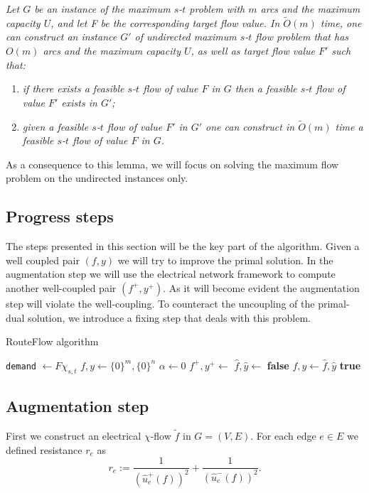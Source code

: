 \begin{lemma}
\textit{Let $G$ be an instance of the maximum $s$-$t$ problem with $m$ arcs and the maximum capacity $U$, and let F be the corresponding target flow value. In $\tilde  O(m)$ time, one can construct an instance $G'$ of undirected maximum $s$-$t$ flow problem that has $O(m)$ arcs and the maximum capacity $U$, as well as target flow value $F'$ such that:}
\begin{enumerate}[label=(\alph*)]
    \item \textit{if there exists a feasible $s$-$t$ flow of value $F$ in $G$ then a feasible $s$-$t$ flow of value $F'$ exists in $G'$;}
    \item \textit{given a feasible $s$-$t$ flow of value $F'$ in $G'$ one can construct in $\tilde O(m)$ time a feasible $s$-$t$ flow of value $F$ in $G$.}
\end{enumerate}
\end{lemma}
As a consequence to this lemma, we will focus on solving the maximum flow problem on the undirected instances only.

\subsection{Progress steps}
The steps presented in this section will be the key part of the algorithm. Given a well coupled pair $(f,y)$ we will try to improve the primal solution. In the augmentation step we will use the electrical network framework to compute another well-coupled pair $(f^+, y^+)$. As it will become evident the augmentation step will violate the well-coupling. To counteract the uncoupling of the primal-dual solution, we introduce a fixing step that deals with this problem.

\begin{algorithm}
\caption{RouteFlow algorithm}
\begin{algorithmic}[1]
\State \texttt{demand} $\gets F\chi_{s,t}$
\State $f,y \gets \{0\}^m,\{0\}^n$
\State $\alpha \gets 0$
    \State $f^+,y^+ \gets$ 
    \State $\hat f, \hat y \gets$ 
        \State \Return \textbf{false}
    \EndIf
    \State $f,y \gets \hat f, \hat y$
\EndWhile
\State \Return \textbf{true}
\EndFunction
\end{algorithmic}
\end{algorithm}

\subsection{Augmentation step}
First we construct an electrical $\chi$-flow $\tilde  f$ in $G=(V,E)$. For each edge $e\in E$ we defined resistance $r
_e$ as
\begin{equation} \label{progress_resistances}
r_e := \frac{1}{(\hat u_e^+(f))^2} + \frac{1}{(\hat u_e^-(f))^2}.
\end{equation}

